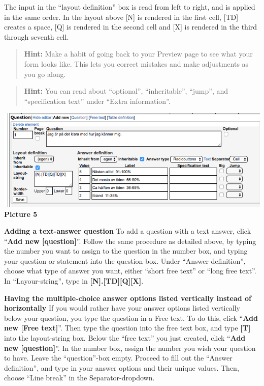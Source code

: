 \documentclass[
]{book}
\begin{document}
The input in the ``layout definition'' box is read from left to right, and is applied in the same order. In the layout above {[}N{]} is rendered in the first cell, {[}TD{]} creates a space, {[}Q{]} is rendered in the second cell and {[}X{]} is rendered in the third through seventh cell.

\begin{quote}
\textbf{Hint:} Make a habit of going back to your Preview page to see what your form looks like. This lets you correct mistakes and make adjustments as you go along.
\end{quote}

\begin{quote}
\textbf{Hint:} You can read about ``optional'', ``inheritable'', ``jump'', and ``specification text'' under ``Extra information''.
\end{quote}

\includegraphics{images/new-images/multiplechoiceQuestion.png}
\textbf{Picture 5}

\textbf{Adding a text-answer question}
To add a question with a text answer, click ``\textbf{Add new {[}question{]}}''. Follow the same procedure as detailed above, by typing the number you want to assign to the question in the number box, and typing your question or statement into the question-box. Under ``Answer definition'', choose what type of answer you want, either ``short free text'' or ``long free text''. In ``Layour-string'', type in \textbf{{[}N{]}.{[}TD{]}{[}Q{]}{[}X{]}}.

\textbf{Having the multiple-choice answer options listed vertically instead of horizontally}
If you would rather have your answer options listed vertically below your question, you type the question in a Free text. To do this, click ``\textbf{Add new {[}Free text{]}}''. Then type the question into the free text box, and type \textbf{{[}T{]}} into the layout-string box.
Below the ``free text'' you just created, click ``\textbf{Add new {[}question{]}}''. In the number box, assign the number you wish your question to have. Leave the ``question''-box empty.
Proceed to fill out the ``Answer definition'', and type in your answer options and their unique values. Then, choose ``Line break'' in the Separator-dropdown.
\end{document}
